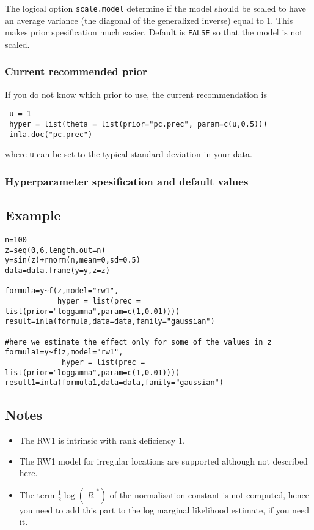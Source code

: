 \documentclass[a4paper,11pt]{article}
\begin{document}
The logical option \verb|scale.model| determine if the model should be
scaled to have an average variance (the diagonal of the generalized
inverse) equal to 1. This makes prior spesification much
easier. Default is \verb|FALSE| so that the model is not scaled.

\subsubsection*{Current recommended prior}
If you do not know which prior to use, the current recommendation is
\begin{verbatim}
 u = 1
 hyper = list(theta = list(prior="pc.prec", param=c(u,0.5)))
 inla.doc("pc.prec")
\end{verbatim}
where {\tt u} can be set to the typical standard deviation in your data.

\subsubsection*{Hyperparameter spesification and default values}



\subsection*{Example}

\begin{verbatim}
n=100
z=seq(0,6,length.out=n)
y=sin(z)+rnorm(n,mean=0,sd=0.5)
data=data.frame(y=y,z=z)

formula=y~f(z,model="rw1",
            hyper = list(prec = list(prior="loggamma",param=c(1,0.01))))
result=inla(formula,data=data,family="gaussian")

#here we estimate the effect only for some of the values in z
formula1=y~f(z,model="rw1",
             hyper = list(prec = list(prior="loggamma",param=c(1,0.01))))
result1=inla(formula1,data=data,family="gaussian")
\end{verbatim}


\subsection*{Notes}

\begin{itemize}
\item The RW1 is intrinsic with rank deficiency 1.
\item The RW1 model for irregular locations are supported although not
    described here.
\item The term $\frac{1}{2}\log(|R|^{*})$ of the normalisation
    constant is not computed, hence you need to add this part to the
    log marginal likelihood estimate, if you need it.
\end{itemize}
\end{document}
